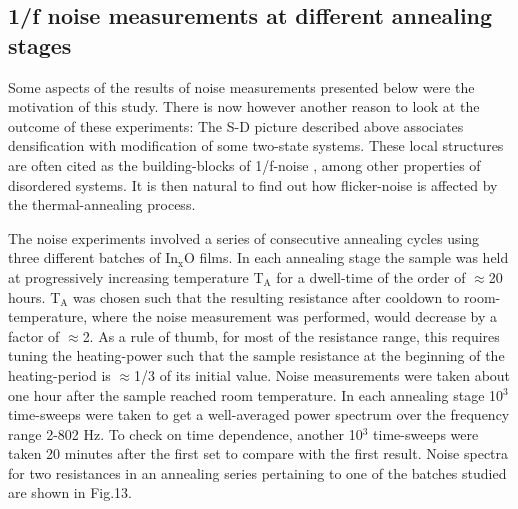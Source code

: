 \documentclass
[preprint,showpacs,byrevtex,10pt,twocolumn,tightenlines,prl,letterpaper]{revtex4}%
\begin{document}
\subsection{1/f noise measurements at different annealing stages}

Some aspects of the results of noise measurements presented below were the
motivation of this study. There is now however another reason to look at the
outcome of these experiments: The S-D picture described above associates
densification with modification of some two-state systems. These local
structures are often cited as the building-blocks of 1/f-noise \cite{27,28},
among other properties of disordered systems. It is then natural to find out
how flicker-noise is affected by the thermal-annealing process.

The noise experiments involved a series of consecutive annealing cycles using
three different batches of In$_{\text{x}}$O films. In each annealing stage the
sample was held at progressively increasing temperature T$_{\text{A}}$ for a
dwell-time of the order of $\approx$20 hours. T$_{\text{A}}$ was chosen such
that the resulting resistance after cooldown to room-temperature, where the
noise measurement was performed, would decrease by a factor of $\approx$2. As
a rule of thumb, for most of the resistance range, this requires tuning the
heating-power such that the sample resistance at the beginning of the
heating-period is $\approx$1/3 of its initial value. Noise measurements were
taken about one hour after the sample reached room temperature. In each
annealing stage 10$^{\text{3}}$ time-sweeps were taken to get a well-averaged
power spectrum over the frequency range 2-802 Hz. To check on time dependence,
another 10$^{\text{3}}$ time-sweeps were taken 20 minutes after the first set
to compare with the first result. Noise spectra for two resistances in an
annealing series pertaining to one of the batches studied are shown in Fig.13.%
\end{document}
